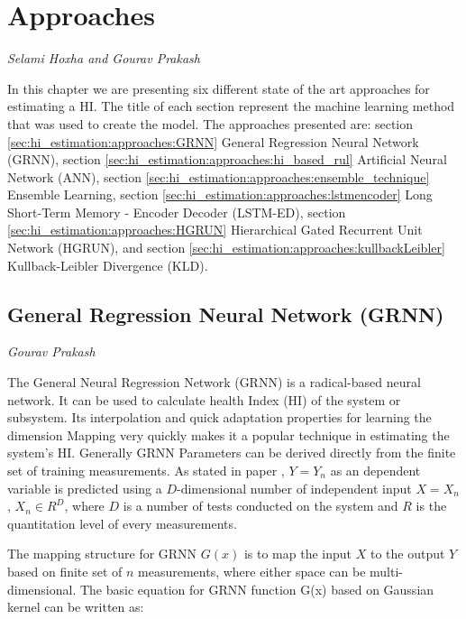 \newpage
\section{Approaches}
\vspace*{-15mm}\hfill{\normalsize\emph{Selami Hoxha and Gourav Prakash}}
\label{sec:hi_estimation:approaches}

In this chapter we are presenting six different state of the art approaches for estimating a HI. The title of each section
represent the machine learning method that was used to create the model. The approaches presented are: section \ref{sec:hi_estimation:approaches:GRNN}
General Regression Neural Network (GRNN), section \ref{sec:hi_estimation:approaches:hi_based_rul} Artificial Neural Network (ANN),
section \ref{sec:hi_estimation:approaches:ensemble_technique} Ensemble Learning, section \ref{sec:hi_estimation:approaches:lstmencoder}
Long Short-Term Memory - Encoder Decoder (LSTM-ED), section \ref{sec:hi_estimation:approaches:HGRUN} Hierarchical Gated Recurrent Unit Network (HGRUN), and
section \ref{sec:hi_estimation:approaches:kullbackLeibler} Kullback-Leibler Divergence (KLD).


\subsection{General Regression Neural Network (GRNN)}
\vspace*{-18mm}\hfill{\normalsize\emph{Gourav Prakash}}
\label{sec:hi_estimation:approaches:GRNN}

The General Neural Regression Network (GRNN) is a radical-based neural network. It can be used to calculate health
Index (HI) of the system or subsystem. Its interpolation and quick adaptation properties for learning the dimension
Mapping very quickly makes it a popular technique in estimating the system's HI. Generally GRNN
Parameters can be derived directly from the finite set of training measurements. As stated in paper
\cite{Islam2018CalculatingAH}, $Y=Y_n$ as an dependent variable is predicted using a $D$-dimensional number of independent
input $X=X_n$, $X_n\in R^D$, where $D$ is a number of tests conducted on the system and $R$ is the quantitation level
of every measurements.


The mapping structure for GRNN $G(x)$ is to map the input $X$ to the output $Y$ based on finite set of $n$
measurements, where either space can be multi-dimensional. The basic equation for GRNN function G(x) based on Gaussian
kernel \cite{Vert2004APO} can be written as:

